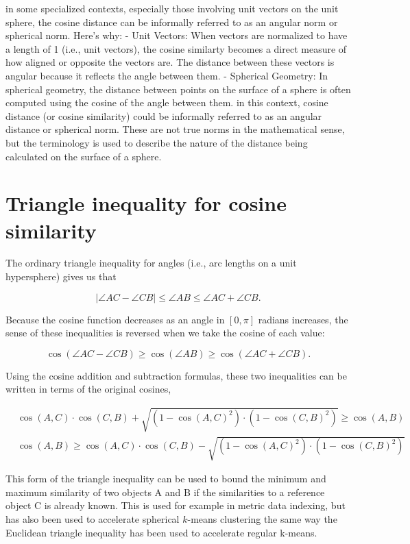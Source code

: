 \documentclass[
  12 pt,
  a4paper,
]{book}
\numberwithin{equation}{section}
\theoremstyle{plain}      %
\theoremstyle{definition} %
\theoremstyle{remark}     %
\theoremstyle{note}         %
\begin{document}
in some specialized contexts, especially those involving unit vectors on
the unit sphere, the cosine distance can be informally referred to as an
angular norm or spherical norm. Here's why: - Unit Vectors: When vectors
are normalized to have a length of 1 (i.e., unit vectors), the cosine
similarty becomes a direct measure of how aligned or opposite the
vectors are. The distance between these vectors is angular because it
reflects the angle between them. - Spherical Geometry: In spherical
geometry, the distance between points on the surface of a sphere is
often computed using the cosine of the angle between them. in this
context, cosine distance (or cosine similarity) could be informally
referred to as an angular distance or spherical norm. These are not true
norms in the mathematical sense, but the terminology is used to describe
the nature of the distance being calculated on the surface of a sphere.

\newpage

\hypertarget{triangle-inequality-for-cosine-similarity}{%
\section{Triangle inequality for cosine
similarity}\label{triangle-inequality-for-cosine-similarity}}

The ordinary triangle inequality for angles (i.e., arc lengths on a unit
hypersphere) gives us that

\[
|\angle A C-\angle C B| \leq \angle A B \leq \angle A C+\angle C B .
\]

Because the cosine function decreases as an angle in \([0, \pi]\)
radians increases, the sense of these inequalities is reversed when we
take the cosine of each value:

\[
\cos (\angle A C-\angle C B) \geq \cos (\angle A B) \geq \cos (\angle A C+\angle C B) .
\]

Using the cosine addition and subtraction formulas, these two
inequalities can be written in terms of the original cosines,

\[
\begin{aligned}
& \cos (A, C) \cdot \cos (C, B)+\sqrt{\left(1-\cos (A, C)^2\right) \cdot\left(1-\cos (C, B)^2\right)} \geq \cos (A, B) \\
& \cos (A, B) \geq \cos (A, C) \cdot \cos (C, B)-\sqrt{\left(1-\cos (A, C)^2\right) \cdot\left(1-\cos (C, B)^2\right)}
\end{aligned}
\]

This form of the triangle inequality can be used to bound the minimum
and maximum similarity of two objects A and B if the similarities to a
reference object C is already known. This is used for example in metric
data indexing, but has also been used to accelerate spherical
\(k\)-means clustering the same way the Euclidean triangle inequality
has been used to accelerate regular k-means.
\end{document}
